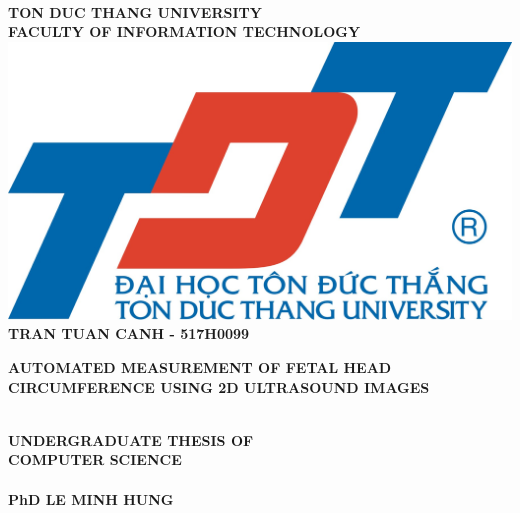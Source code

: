 \thispagestyle{empty}
\vspace{1cm}
\begin{center}
{\fontsize{14pt}{1}\selectfont {VIETNAM GENERAL CONFEDERATION OF LABOUR}}\\
{\fontsize{14pt}{1}\selectfont \textbf{TON DUC THANG UNIVERSITY}}\\
{\fontsize{14pt}{1}\selectfont \textbf{FACULTY OF INFORMATION TECHNOLOGY}}\\[1cm]
\includegraphics[scale=0.3]{./hinhanh/tdt.jpg}\\[1.7cm]
{\fontsize{14pt}{1}\selectfont \textbf{TRAN TUAN CANH - 517H0099}}\\[1.7cm]

{\parbox[t]{10cm}{\fontsize{24pt}{1}\selectfont 
	\begin{center}
			\large\textbf{AUTOMATED MEASUREMENT OF FETAL HEAD CIRCUMFERENCE USING 2D ULTRASOUND IMAGES}
	\end{center}}
}\\[1.3cm]

{\fontsize{20pt}{1}\selectfont \textbf{UNDERGRADUATE THESIS OF}}\\
{\fontsize{20pt}{1}\selectfont \textbf{COMPUTER SCIENCE}}\\[1cm]

{\fontsize{14pt}{1}\selectfont {Advised by}}\\
{\fontsize{14pt}{1}\selectfont \textbf{PhD LE MINH HUNG}}\\

\end{center}



